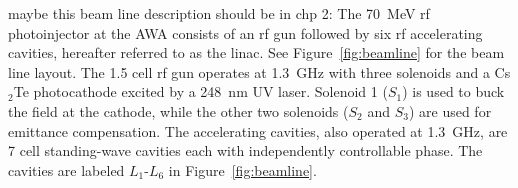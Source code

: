 \documentclass{iitthesis}
\newcommand{\nrnote}[1]{\textsf{{\color{blue}{ NN note:}   #1 }}}
\begin{document}
 \label{sec:pareto}
\nrnote{maybe this beam line description should be in chp 2:
The \SI{70}{MeV} rf photoinjector at the AWA
consists of an rf gun followed by six rf accelerating cavities, 
hereafter referred to as the linac. 
See Figure~\ref{fig:beamline} for the beam line layout. 
The 1.5 cell rf gun operates at \SI{1.3}{GHz} with three solenoids 
and a Cs$_{2}$Te photocathode excited by a \SI{248}{nm} UV laser.  
Solenoid 1 ($S_1$) is used to buck the field at the cathode,
while the other two solenoids ($S_2$ and $S_3$) are used for emittance compensation.  
The accelerating cavities, also operated at \SI{1.3}{GHz}, are 7 cell standing-wave 
cavities \cite{Power:2010zza} each with independently controllable phase. 
The cavities are labeled $L_1$-$L_6$ in Figure~\ref{fig:beamline}. }
\def \gunleft {-1.0}
\def \gunright {0.3}
\def \loneright {1.0}
\def \ltworight {3.5}
\def \lthreeright {5.0}
\def \lfourright {7.0}
\def \lfiveright {8.5}
\def \lsixright {10}
\end{document}
